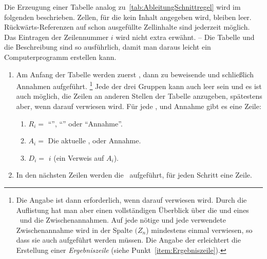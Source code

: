 {Die Erzeugung einer Tabelle analog zu~\vref{tab:AbleitungSchnittregel} wird im folgenden beschrieben.
Zellen, für die kein Inhalt angegeben wird, bleiben leer.
Rückwärts-Referenzen auf schon ausgefüllte Zellinhalte sind jederzeit möglich.
Das Eintragen der Zeilennummer $i$ wird nicht extra erwähnt.
-- Die Tabelle und die Beschreibung sind so ausführlich, damit man daraus leicht ein Computerprogramm erstellen kann.
%
\begin{enumerate}
	\item Am Anfang der Tabelle werden zuerst , dann zu beweisende  und schließlich Annahmen aufgeführt.%
	\footnote{%
		Die Angabe ist dann erforderlich, wenn darauf verwiesen wird.
		Durch die Auflistung hat man aber einen vollständigen Überblick über die  und  eines \Beweises\ und die Zwischenannahmen.
		Auf jede nötige  und jede verwendete Zwischenannahme wird in der Spalte $(Z_n$) mindestens einmal verwiesen, so dass sie auch aufgeführt werden müssen.
		Die Angabe der  erleichtert die Erstellung einer \emph{Ergebniszeile} (siehe Punkt~\ref{item:Ergebniszeile}).
	}
	Jede der drei Gruppen kann auch leer sein und es ist auch möglich, die Zeilen an anderen Stellen der Tabelle anzugeben, spätestens aber, wenn darauf verwiesen wird.
	Für jede ,  und Annahme gibt es eine Zeile:
	\begin{enumerate}
		\item $R_i =$ \enquote{}, \enquote{} oder \enquote{Annahme}.
		\item $A_i =$ Die aktuelle ,  oder Annahme.
		\item $D_i =$ $i$ \quad (ein Verweis auf $A_i$).
	\end{enumerate}
	\item In den nächsten Zeilen werden die \Beweisschritte\ aufgeführt, für jeden Schritt eine Zeile.


\end{enumerate}}

